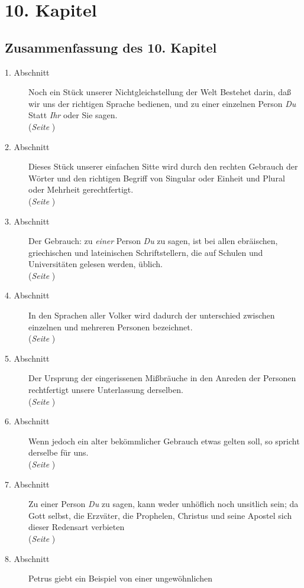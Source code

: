 
\chapter{10. Kapitel} \label{kap10}
\section{Zusammenfassung des 10. Kapitel}

\footnotesize
\begin{description}
\item[1. Abschnitt] Noch ein Stück unserer Nichtgleichstellung der Welt Bestehet
darin, daß wir uns der richtigen Sprache bedienen, und zu einer einzelnen Person
\textit{Du} Statt \textit{Ihr} oder Sie sagen.
\\(\textit{Seite \pageref{kap10_ab1}})
\item[2. Abschnitt] Dieses Stück unserer einfachen Sitte wird durch den rechten
Gebrauch der Wörter und den richtigen Begriff von Singular oder Einheit und
Plural oder Mehrheit gerechtfertigt.
\\(\textit{Seite \pageref{kap10_ab2}})
\item[3. Abschnitt] Der Gebrauch: zu \textit{einer} Person \textit{Du} zu sagen, ist bei
allen ebräischen, griechischen und lateinischen Schriftstellern, die auf
Schulen und Universitäten gelesen werden, üblich.
\\(\textit{Seite \pageref{kap10_ab3}})
\item[4. Abschnitt] In den Sprachen aller Volker wird dadurch der unterschied
zwischen einzelnen und mehreren Personen bezeichnet.
\\(\textit{Seite \pageref{kap10_ab4}})
\item[5. Abschnitt] Der Ursprung der eingerissenen Mißbräuche in den Anreden der
Personen rechtfertigt unsere Unterlassung derselben.
\\(\textit{Seite \pageref{kap10_ab5}})
\item[6. Abschnitt] Wenn jedoch ein alter bekömmlicher Gebrauch etwas gelten
soll, so spricht derselbe für uns.
\\(\textit{Seite \pageref{kap10_ab6}})
\item[7. Abschnitt] Zu einer Person \textit{Du} zu sagen, kann weder unhöflich noch
unsitlich sein; da Gott selbst, die Erzväter, die Prophelen, Christus und
seine Apostel sich dieser Redensart verbieten
\\(\textit{Seite \pageref{kap10_ab7}})
\item[8. Abschnitt] Petrus giebt ein Beispiel von einer ungewöhnlichen

\end{description}
